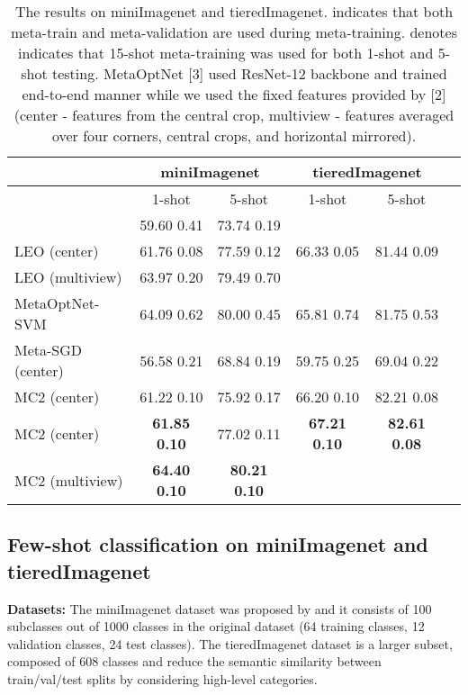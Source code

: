 \documentclass{article}
\begin{document}
\begin{table}[h]
\vskip -0.1in
\caption{The results on miniImagenet and tieredImagenet.  indicates that both meta-train and meta-validation are used during meta-training.  denotes indicates that 15-shot meta-training was used for both 1-shot and 5-shot testing. MetaOptNet [3] used ResNet-12 backbone and trained end-to-end manner while we used the fixed features provided by [2] (center - features from the central crop, multiview - features averaged over four corners, central crops, and horizontal mirrored).}
\vskip -0.1in
\label{table:miniimagenet_wrn}
\begin{center}
\begin{small}
\begin{tabular}{lccccc}
\toprule
& \multicolumn{2}{c}{miniImagenet} & \multicolumn{2}{c}{tieredImagenet} \\
\midrule
& 1-shot & 5-shot & 1-shot & 5-shot \\
\midrule
\cite{Qiao-cvpr18} & 59.60  0.41 & 73.74  0.19 &  &  \\
LEO (center) \cite{rusu-iclr19} & 61.76  0.08 & 77.59  0.12 & 66.33  0.05 & 81.44  0.09 \\
LEO (multiview) \cite{rusu-iclr19} & 63.97  0.20 & 79.49  0.70 &  &  \\
MetaOptNet-SVM \cite{metaopt} & 64.09  0.62 & 80.00  0.45 & 65.81  0.74 & 81.75  0.53 \\
\midrule
Meta-SGD (center)  & 56.58  0.21 &  68.84  0.19 & 59.75  0.25 & 69.04  0.22 \\
MC2 (center)       & 61.22  0.10 &  75.92  0.17 & 66.20  0.10 & 82.21  0.08 \\
MC2 (center) & \textbf{61.85}  \textbf{0.10} &  77.02  0.11 & \textbf{67.21}  \textbf{0.10} & \textbf{82.61}  \textbf{0.08} \\
MC2 (multiview) &  \textbf{64.40}  \textbf{0.10}  & \textbf{80.21}  \textbf{0.10} &  &  \\
\bottomrule
\end{tabular}
\end{small}
\end{center}
\vskip -0.1in
\end{table}




\subsection{Few-shot classification on miniImagenet and tieredImagenet}

\textbf{Datasets:} The miniImagenet dataset was proposed by \cite{matchingnet,Ravi-iclr-2017} and it consists of 100 subclasses out of 1000 classes in the original dataset (64 training classes, 12 validation classes, 24 test classes). The tieredImagenet dataset \cite{ren-iclr18} is a larger subset, composed of 608 classes and reduce the semantic similarity between train/val/test splits by considering high-level categories.
\end{document}
